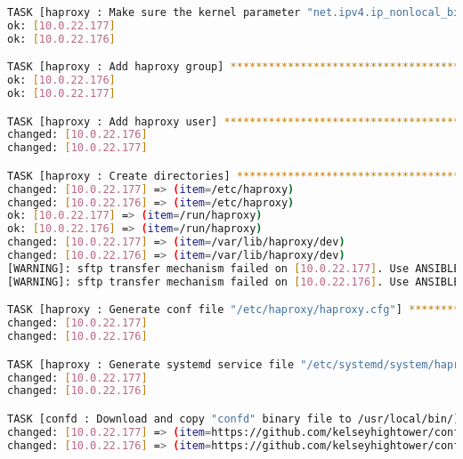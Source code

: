 \begin{flushleft}
\begin{lstlisting}[language=bash, caption=Deploy - Anhang - Deployt,captionpos=b,label={lst:deploy-appendix-deployt},breaklines=true]
TASK [haproxy : Make sure the kernel parameter "net.ipv4.ip_nonlocal_bind" are enabled] ***************************************************************************************************************************
ok: [10.0.22.177]
ok: [10.0.22.176]

TASK [haproxy : Add haproxy group] ********************************************************************************************************************************************************************************
ok: [10.0.22.176]
ok: [10.0.22.177]

TASK [haproxy : Add haproxy user] *********************************************************************************************************************************************************************************
changed: [10.0.22.176]
changed: [10.0.22.177]

TASK [haproxy : Create directories] *******************************************************************************************************************************************************************************
changed: [10.0.22.177] => (item=/etc/haproxy)
changed: [10.0.22.176] => (item=/etc/haproxy)
ok: [10.0.22.177] => (item=/run/haproxy)
ok: [10.0.22.176] => (item=/run/haproxy)
changed: [10.0.22.177] => (item=/var/lib/haproxy/dev)
changed: [10.0.22.176] => (item=/var/lib/haproxy/dev)
[WARNING]: sftp transfer mechanism failed on [10.0.22.177]. Use ANSIBLE_DEBUG=1 to see detailed information
[WARNING]: sftp transfer mechanism failed on [10.0.22.176]. Use ANSIBLE_DEBUG=1 to see detailed information

TASK [haproxy : Generate conf file "/etc/haproxy/haproxy.cfg"] ****************************************************************************************************************************************************
changed: [10.0.22.177]
changed: [10.0.22.176]

TASK [haproxy : Generate systemd service file "/etc/systemd/system/haproxy.service"] ******************************************************************************************************************************
changed: [10.0.22.177]
changed: [10.0.22.176]

TASK [confd : Download and copy "confd" binary file to /usr/local/bin/] *******************************************************************************************************************************************
changed: [10.0.22.177] => (item=https://github.com/kelseyhightower/confd/releases/download/v0.16.0/confd-0.16.0-linux-amd64)
changed: [10.0.22.176] => (item=https://github.com/kelseyhightower/confd/releases/download/v0.16.0/confd-0.16.0-linux-amd64)


\end{lstlisting}
\end{flushleft}
